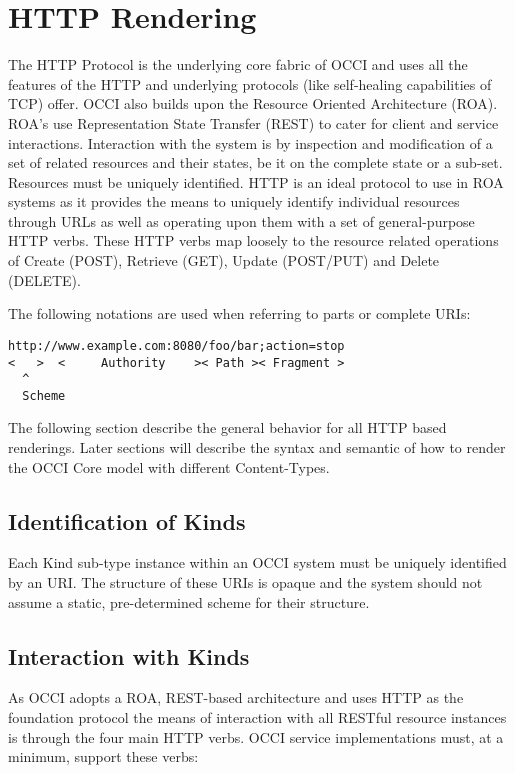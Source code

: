 \documentclass[10pt,a4paper]{article}
\begin{document}
\section{HTTP Rendering}
The HTTP Protocol is the underlying core fabric of OCCI and uses all
the features of the HTTP and underlying protocols (like self-healing
capabilities of TCP) offer. OCCI also builds upon the Resource
Oriented Architecture (ROA). ROA's use Representation State Transfer
(REST) to cater for client and service interactions. Interaction with
the system is by inspection and modification of a set of related
resources and their states, be it on the complete state or a
sub-set. Resources must be uniquely identified. HTTP is an ideal
protocol to use in ROA systems as it provides the means to uniquely
identify individual resources through URLs as well as operating upon
them with a set of general-purpose HTTP verbs. These HTTP verbs map
loosely to the resource related operations of Create (POST), Retrieve
(GET), Update (POST/PUT) and Delete (DELETE).

The following notations are used when referring to parts or complete
URIs:

\begin{verbatim}
http://www.example.com:8080/foo/bar;action=stop
<   >  <     Authority    >< Path >< Fragment >
  ^
  Scheme
\end{verbatim}

The following section describe the general behavior for all HTTP based
renderings. Later sections will describe the syntax and semantic of
how to render the OCCI Core model with different Content-Types.

\subsection{Identification of Kinds}
Each Kind sub-type instance within an OCCI system must be uniquely
identified by an URI. The structure of these URIs is opaque and the
system should not assume a static, pre-determined scheme for their
structure.

\subsection{Interaction with Kinds}
As OCCI adopts a ROA, REST-based architecture and uses HTTP as the
foundation protocol the means of interaction with all RESTful resource
instances is through the four main HTTP verbs. OCCI service
implementations must, at a minimum, support these verbs:
\end{document}
